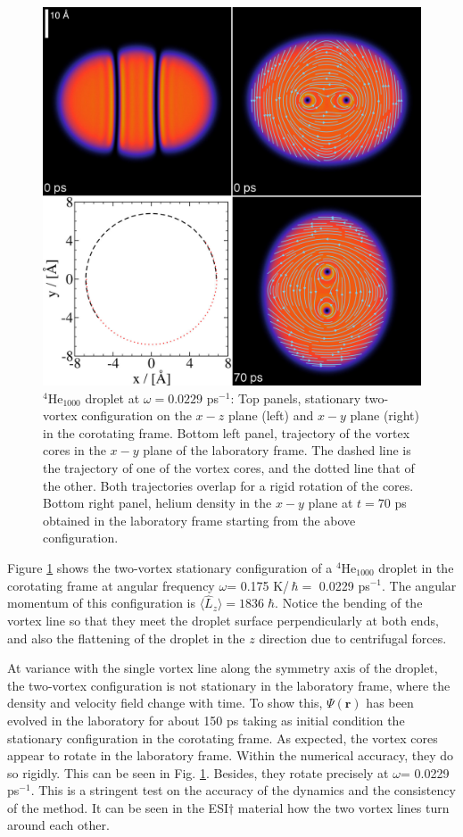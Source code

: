 \begin{figure}[h]
\centerline{\includegraphics[width=0.8\linewidth,clip]{fig7}}
\caption{\label{fig7-capture}
$^4$He$_{1000}$ droplet at $\omega= 0.0229$ ps$^{-1}$: Top panels, stationary 
two-vortex configuration on the $x-z$ plane (left) and  $x-y$ plane (right)  in the corotating frame.
Bottom left panel, trajectory of the vortex cores 
in the $x-y$ plane of the laboratory frame. 
The dashed line is the trajectory of one of the vortex cores, and the dotted line that of the other. Both trajectories  overlap for a rigid rotation of the cores.
Bottom right panel, helium density in the $x-y$ plane at $t=70$ ps obtained in the laboratory frame starting from the above configuration.\citep{ESI} 
}
\end{figure}

Figure \ref{fig7-capture} shows the two-vortex  
stationary configuration of a $^4$He$_{1000}$ droplet  in the corotating frame 
at angular frequency $\omega$= 0.175 K/\,$\hbar=$ 0.0229 ps$^{-1}$. 
The angular momentum  of this configuration is  $\langle \hat{L}_z \rangle = 1836 \; \hbar$. 
Notice the bending 
of the vortex line so that they meet  
the droplet surface perpendicularly at both ends, and also the 
flattening of the droplet in the $z$ direction
due to centrifugal forces.

At variance with the single vortex line along the symmetry 
axis of the droplet, the two-vortex  configuration is not stationary in the laboratory frame, 
where the density and velocity field change with time. 
To show this, $\Psi(\mathbf{r})$ has been evolved 
in the laboratory  for about 150 ps
taking as initial condition the stationary 
configuration in the corotating frame. 
As expected, the vortex cores appear to rotate in the laboratory frame. 
Within the numerical accuracy, they do so rigidly. This can be seen in 
Fig. \ref{fig7-capture}. Besides, they rotate precisely at 
$\omega$= 0.0229 ps$^{-1}$. This is a  stringent test 
on the accuracy of the dynamics and the consistency of the method.
It can be seen in the ESI$\dag$ 
material how  the two vortex lines turn around each other.

